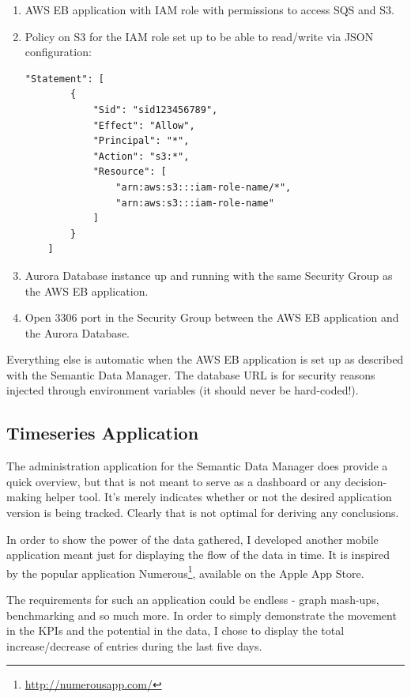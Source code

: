 \begin{enumerate}
	\item AWS EB application with IAM role with permissions to access SQS and S3.
	\item Policy on S3 for the IAM role set up to be able to read/write via JSON configuration:
	
\begin{lstlisting}
"Statement": [
		{
			"Sid": "sid123456789",
			"Effect": "Allow",
			"Principal": "*",
			"Action": "s3:*",
			"Resource": [
				"arn:aws:s3:::iam-role-name/*",
				"arn:aws:s3:::iam-role-name"
			]
		}
	]
\end{lstlisting}	
	
	\item Aurora Database instance up and running with the same Security Group as the AWS EB application.
	\item Open 3306 port in the Security Group between the AWS EB application and the Aurora Database.
\end{enumerate}

Everything else is automatic when the AWS EB application is set up as described with the Semantic Data Manager. The database URL is for security reasons injected through environment variables (it should never be hard-coded!).

\subsection{Timeseries Application}

The administration application for the Semantic Data Manager does provide a quick overview, but that is not meant to serve as a dashboard or any decision-making helper tool. It's merely indicates whether or not the desired application version is being tracked. Clearly that is not optimal for deriving any conclusions.

In order to show the power of the data gathered, I developed another mobile application meant just for displaying the flow of the data in time. It is inspired by the popular application Numerous\footnote{\url{http://numerousapp.com/}}, available on the Apple App Store.

The requirements for such an application could be endless - graph mash-ups, benchmarking and so much more. In order to simply demonstrate the movement in the KPIs and the potential in the data, I chose to display the total increase/decrease of entries during the last five days.

\newpage

